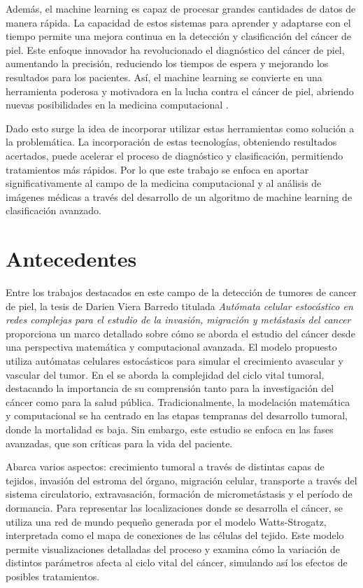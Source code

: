 Además, el machine learning es capaz de procesar grandes cantidades de datos de manera rápida. La capacidad de estos sistemas para aprender y adaptarse con el tiempo permite una mejora continua en la detección y clasificación del cáncer de piel. Este enfoque innovador ha revolucionado el diagnóstico del cáncer de piel, aumentando la precisión, reduciendo los tiempos de espera y mejorando los resultados para los pacientes. Así, el machine learning se convierte en una herramienta poderosa y motivadora en la lucha contra el cáncer de piel, abriendo nuevas posibilidades en la medicina computacional .

Dado esto surge la idea de incorporar utilizar estas herramientas como solución a la problemática. La incorporación de estas tecnologías, obteniendo resultados acertados, puede acelerar el proceso de diagnóstico y clasificación, permitiendo tratamientos más rápidos. Por lo que este trabajo se enfoca en aportar significativamente al campo de la medicina computacional y al análisis de imágenes médicas a través del desarrollo de un algoritmo de machine learning de clasificación avanzado.

\section*{Antecedentes}

Entre los trabajos destacados en este campo de la detección de tumores de cancer de piel, la tesis de Darien Viera Barredo titulada \textit{Autómata celular estocástico en redes complejas para el estudio de la invasión, migración y metástasis del cancer} proporciona un marco detallado sobre cómo se aborda el estudio del cáncer desde una perspectiva matemática y computacional avanzada. El modelo propuesto utiliza autómatas celulares estocásticos para simular el crecimiento avascular y vascular del tumor. En el se aborda la complejidad del ciclo vital tumoral, destacando la importancia de su comprensión tanto para la investigación del cáncer como para la salud pública. Tradicionalmente, la modelación matemática y computacional se ha centrado en las etapas tempranas del desarrollo tumoral, donde la mortalidad es baja. Sin embargo, este estudio se enfoca en las fases avanzadas, que son críticas para la vida del paciente.

Abarca varios aspectos: crecimiento tumoral a través de distintas capas de tejidos, invasión del estroma del órgano, migración celular, transporte a través del sistema circulatorio, extravasación, formación de micrometástasis y el período de dormancia. Para representar las localizaciones donde se desarrolla el cáncer, se utiliza una red de mundo pequeño generada por el modelo Watts-Strogatz, interpretada como el mapa de conexiones de las células del tejido. Este modelo permite visualizaciones detalladas del proceso y examina cómo la variación de distintos parámetros afecta al ciclo vital del cáncer, simulando así los efectos de posibles tratamientos.

